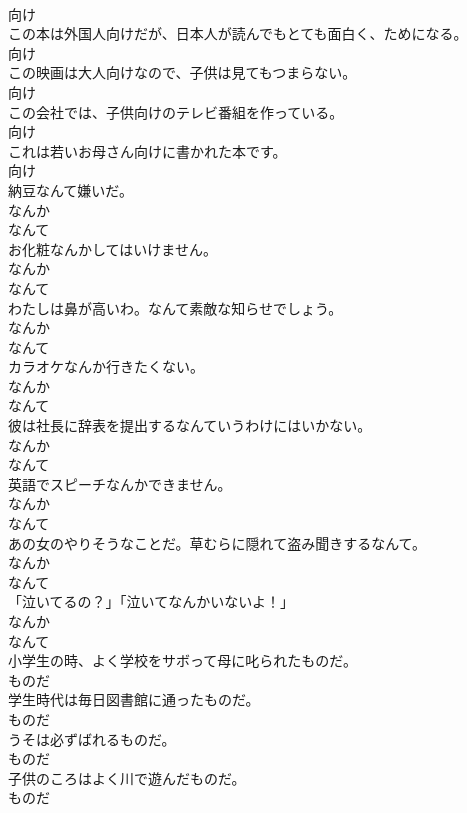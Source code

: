 \documentclass[8pt]{extreport}
\begin{document}
\begin{CJK}{UTF8}{min}
\\	向け
\\	この本は外国人向けだが、日本人が読んでもとても面白く、ためになる。	
\\	向け
\\	この映画は大人向けなので、子供は見てもつまらない。	
\\	向け
\\	この会社では、子供向けのテレビ番組を作っている。	
\\	向け
\\	これは若いお母さん向けに書かれた本です。	
\\	向け
\\	納豆なんて嫌いだ。	
\\	なんか 
\\	なんて
\\	お化粧なんかしてはいけません。	
\\	なんか 
\\	なんて
\\	わたしは鼻が高いわ。なんて素敵な知らせでしょう。	
\\	なんか 
\\	なんて
\\	カラオケなんか行きたくない。	
\\	なんか 
\\	なんて
\\	彼は社長に辞表を提出するなんていうわけにはいかない。	
\\	なんか 
\\	なんて
\\	英語でスピーチなんかできません。	
\\	なんか 
\\	なんて
\\	あの女のやりそうなことだ。草むらに隠れて盗み聞きするなんて。	
\\	なんか 
\\	なんて
\\	「泣いてるの？」「泣いてなんかいないよ！」	
\\	なんか 
\\	なんて
\\	小学生の時、よく学校をサボって母に叱られたものだ。	
\\	ものだ
\\	学生時代は毎日図書館に通ったものだ。	
\\	ものだ
\\	うそは必ずばれるものだ。	
\\	ものだ
\\	子供のころはよく川で遊んだものだ。	
\\	ものだ

\end{CJK}
\end{document}
